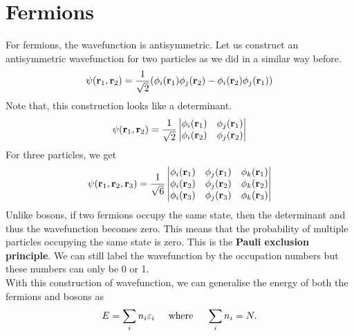 \section{Fermions}
    For fermions, the wavefunction is antisymmetric. Let us construct an antisymmetric wavefunction for two particles as we did in a similar way before. 
    \begin{equation}
        \psi(\mathbf{r}_1,\mathbf{r}_2) = \frac{1}{\sqrt{2}}(\phi_i(\mathbf{r}_1)\phi_j(\mathbf{r}_2)-\phi_i(\mathbf{r}_2)\phi_j(\mathbf{r}_1))
    \end{equation}
    Note that, this construction looks like a determinant.
    \begin{equation}
        \psi(\mathbf{r}_1,\mathbf{r}_2)=\frac{1}{\sqrt{2}}\begin{vmatrix}
            \phi_i(\mathbf{r}_1) & \phi_j(\mathbf{r}_1) \\ 
            \phi_i(\mathbf{r}_2) & \phi_j(\mathbf{r}_2)
        \end{vmatrix}
    \end{equation}
    For three particles, we get
    \begin{equation}
        \psi(\mathbf{r}_1,\mathbf{r}_2,\mathbf{r}_3) = \frac{1}{\sqrt{6}}\begin{vmatrix}
            \phi_i(\mathbf{r}_1) & \phi_j(\mathbf{r}_1) & \phi_k(\mathbf{r}_1) \\ 
            \phi_i(\mathbf{r}_2) & \phi_j(\mathbf{r}_2) & \phi_k(\mathbf{r}_2) \\ 
            \phi_i(\mathbf{r}_3) & \phi_j(\mathbf{r}_3) & \phi_k(\mathbf{r}_3)
        \end{vmatrix}
    \end{equation}
    Unlike bosons, if two fermions occupy the same state, then the determinant and thus the wavefunction becomes zero. This means that the probability of multiple particles occupying the same state is zero. This is the \textbf{Pauli exclusion principle}. We can still label the wavefunction by the occupation numbers but these numbers can only be 0 or 1. \\
    With this construction of wavefunction, we can generalise the energy of both the fermions and bosons as
    \begin{equation}
        E = \sum_in_i\varepsilon_i \hspace{0.5cm}\mathrm{where}\hspace{0.5cm}\sum_in_i=N.
    \end{equation}
\newpage
